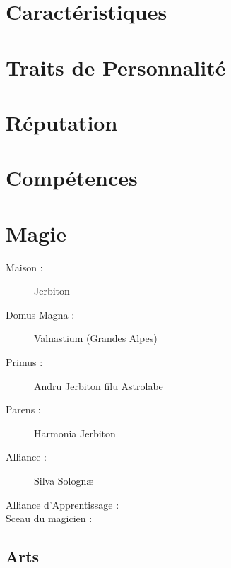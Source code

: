 \section*{Caractéristiques}


\caractableMP

\begin{multicols*}{2}

\longVFQs

\section*{Traits de Personnalité}

\traitslong

\section*{Réputation}

\reputationslong


\section*{Compétences}

\abilitieslong


\end{multicols*}
\pagebreak



\section*{Magie}
\begin{multicols}{2}
\begin{description}
\item[Maison :] Jerbiton
\item[Domus Magna :] Valnastium (Grandes Alpes)
\item[Primus :] Andru Jerbiton filu Astrolabe
\item[Parens :] Harmonia Jerbiton
\item[Alliance :] Silva Solognæ
\item[Alliance d'Apprentissage :]
\item[Sceau du magicien :] \magussigil
\end{description}
\end{multicols}
\subsection*{Arts}


